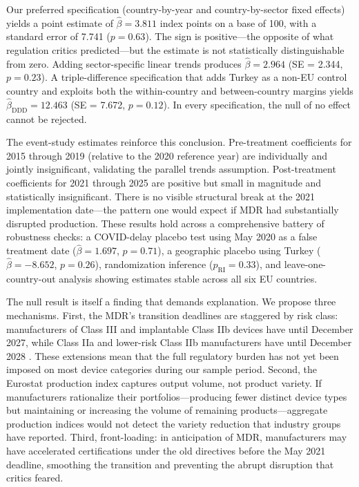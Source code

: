 \documentclass[12pt]{article}
\begin{document}
Our preferred specification (country-by-year and country-by-sector fixed effects) yields a point estimate of $\hat{\beta} = 3.811$ index points on a base of 100, with a standard error of 7.741 ($p = 0.63$). The sign is positive---the opposite of what regulation critics predicted---but the estimate is not statistically distinguishable from zero. Adding sector-specific linear trends produces $\hat{\beta} = 2.964$ (SE = 2.344, $p = 0.23$). A triple-difference specification that adds Turkey as a non-EU control country and exploits both the within-country and between-country margins yields $\hat{\beta}_{\text{DDD}} = 12.463$ (SE = 7.672, $p = 0.12$). In every specification, the null of no effect cannot be rejected.

The event-study estimates reinforce this conclusion. Pre-treatment coefficients for 2015 through 2019 (relative to the 2020 reference year) are individually and jointly insignificant, validating the parallel trends assumption. Post-treatment coefficients for 2021 through 2025 are positive but small in magnitude and statistically insignificant. There is no visible structural break at the 2021 implementation date---the pattern one would expect if MDR had substantially disrupted production. These results hold across a comprehensive battery of robustness checks: a COVID-delay placebo test using May 2020 as a false treatment date ($\hat{\beta} = 1.697$, $p = 0.71$), a geographic placebo using Turkey ($\hat{\beta} = -8.652$, $p = 0.26$), randomization inference ($p_{\text{RI}} = 0.33$), and leave-one-country-out analysis showing estimates stable across all six EU countries.

The null result is itself a finding that demands explanation. We propose three mechanisms. First, the MDR's transition deadlines are staggered by risk class: manufacturers of Class III and implantable Class IIb devices have until December 2027, while Class IIa and lower-risk Class IIb manufacturers have until December 2028 \citep{europeancommission2025simplification}. These extensions mean that the full regulatory burden has not yet been imposed on most device categories during our sample period. Second, the Eurostat production index captures output volume, not product variety. If manufacturers rationalize their portfolios---producing fewer distinct device types but maintaining or increasing the volume of remaining products---aggregate production indices would not detect the variety reduction that industry groups have reported. Third, front-loading: in anticipation of MDR, manufacturers may have accelerated certifications under the old directives before the May 2021 deadline, smoothing the transition and preventing the abrupt disruption that critics feared.
\end{document}
